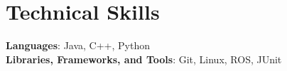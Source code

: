 \documentclass[letterpaper,11pt]{article}
\begin{document}
\section{Technical Skills}
 \begin{itemize}[leftmargin=0.15in, label={}]
    \small{\item{
     \textbf{Languages}{: Java, C++, Python} \\
     \textbf{Libraries, Frameworks, and Tools}{: Git, Linux, ROS, JUnit} \\
    }}
 \end{itemize}


\end{document}
